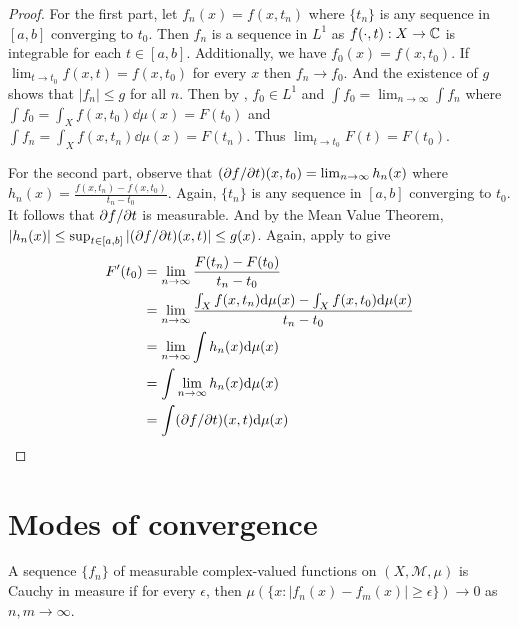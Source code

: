 \begin{proof}
    For the first part, let $f_n(x) = f(x, t_n)$ where $\{ t_n \}$ is any sequence in $[a, b]$ converging to $t_0$.
    Then ${f_n}$ is a sequence in $L^1$ as $f(\cdot, t): X \to \mathbb{C}$ is integrable for each $t \in [a, b]$.
    Additionally, we have $f_0(x) = f(x, t_0)$.
    If $\lim_{t \to t_0} f(x,t) = f(x, t_0)$ for every $x$ then $f_n \to f_0$.
    And the existence of $g$ shows that $|f_n| \le g$ for all $n$.
    Then by , $f_0 \in L^1$ and $\int f_0 = \lim_{n \to \infty} \int f_n$ where $\int f_0 = \int_{X} f(x, t_0) \dd \mu(x) = F(t_0)$ and $\int f_n = \int_{X} f(x, t_n) \dd \mu(x) = F(t_n)$.
    Thus $\lim_{t \to t_0} F(t) = F(t_0)$.

    For the second part, observe that $(\partial f / \partial t)(x,t_0) = \lim_{n \to \infty} h_n(x)$ where $h_n(x) = \frac{f(x, t_n) - f(x, t_0)}{t_n - t_0}$.
    Again, $\{ t_n \}$ is any sequence in $[a, b]$ converging to $t_0$.
    It follows that $\partial f / \partial t$ is measurable.
    And by the Mean Value Theorem, $|h_n(x)| \le \sup_{t \in [a, b]} |(\partial f / \partial t)(x, t)| \le g(x)$.
    Again, apply  to give
    \begin{align}
        F'(t_0) &= \lim_{n \to \infty} \frac{F(t_n) - F(t_0)}{t_n - t_0} \\
        &= \lim_{n \to \infty} \frac{\int_X f(x,t_n) \mathrm{d} \mu(x) - \int_X f(x,t_0) \mathrm{d} \mu(x)}{t_n - t_0} \\
        &= \lim_{n \to \infty} \int h_n(x) \mathrm{d} \mu(x) \\
        &= \int \lim_{n \to \infty} h_n(x) \mathrm{d} \mu(x) \\
        &= \int (\partial f / \partial t)(x,t) \mathrm{d} \mu(x)
    \end{align}
\end{proof}

\section{Modes of convergence}

\begin{definition}
    A sequence $\{ f_n \}$ of measurable complex-valued functions on $(X, \mathcal{M}, \mu)$ is Cauchy in measure if for every $\epsilon$, then $\mu(\{ x: |f_n(x) - f_m(x)| \ge \epsilon \}) \to 0$ as $n, m \to \infty$.
\end{definition}

